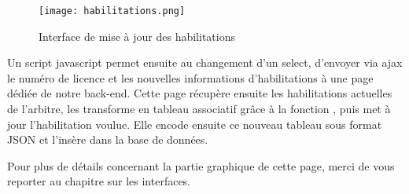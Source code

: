 \begin{figure}[!h]
    \centering
    \texttt{[image: habilitations.png]}
    \caption{Interface de mise à jour des habilitations}
\end{figure}

\newpage

Un script javascript permet ensuite au changement d’un select, d’envoyer via ajax le numéro de licence et les nouvelles informations d’habilitations à une page dédiée de notre back-end. Cette page récupère ensuite les habilitations actuelles de l’arbitre, les transforme en tableau associatif grâce à la fonction , puis met à jour l’habilitation voulue. Elle encode ensuite ce nouveau tableau sous format JSON et l’insère dans la base de données.

Pour plus de détails concernant la partie graphique de cette page, merci de vous reporter au chapitre sur les interfaces.